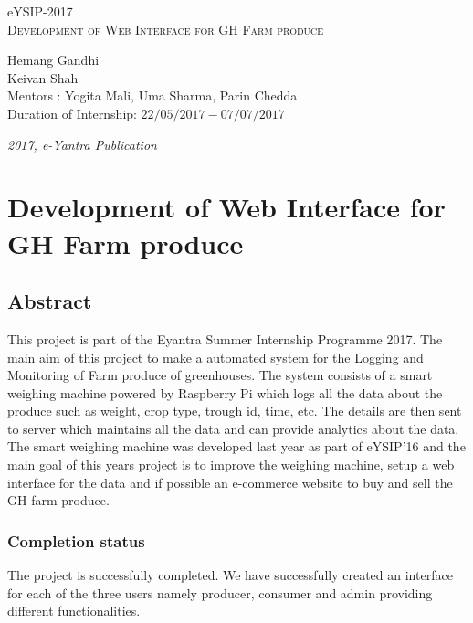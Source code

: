 \documentclass[a4paper,12pt,oneside]{book}
\begin{document}
	
	\begin{titlepage}
		\raggedright
		{\Large eYSIP-2017\\[1cm]}
		{\Huge\scshape Development of Web Interface for GH Farm produce \\[.1in]}
		\vfill
		\begin{flushright}
			{\large Hemang Gandhi \\}
			{\large Keivan Shah \\}
			{\large Mentors : Yogita Mali, Uma Sharma, Parin Chedda \\}
			{\large Duration of Internship: $ 22/05/2017-07/07/2017 $ \\}
		\end{flushright}
		
		{\itshape 2017, e-Yantra Publication}
	\end{titlepage}
	
	\chapter[Project Tag]{Development of Web Interface for GH Farm produce}
	\section*{Abstract}
	This project is part of the Eyantra Summer Internship Programme 2017. The main aim of this project to make a automated system for the Logging and Monitoring of Farm produce of greenhouses. The system consists of a smart weighing machine powered by Raspberry Pi which logs all the data about the produce such as weight, crop type, trough id, time, etc. The details are then sent to server which maintains all the data and can provide analytics about the data. The smart weighing machine was developed last year as part of eYSIP'16 and the main goal of this years project is to improve the weighing machine, setup a web interface for the data and if possible an e-commerce website to buy and sell the GH farm produce.
	
	\subsection*{Completion status}
	The project is successfully completed. We have successfully created an interface for each of the three users namely producer, consumer and admin providing different functionalities.
	
\end{document}
